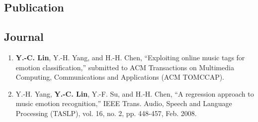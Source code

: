 \documentclass{res}
\begin{document}
\begin{CJK}{UTF8}{bsmi}
\begin{resume}
\section{Publication}
	\vspace{-0.1in}
	\subsection{Journal}
		\begin{enumerate}[1.~]
			\item \textbf{Y.-C. Lin}, Y.-H. Yang, and H.-H. Chen, 
				``Exploiting online music tags for emotion classification,''
				submitted to ACM Transactions on Multimedia Computing, Communications and Applications (ACM TOMCCAP).
			\item Y.-H. Yang, \textbf{Y.-C. Lin}, Y.-F. Su, and H.-H. Chen, 
				``A regression approach to music emotion recognition,'' 
				IEEE Trans. Audio, Speech and Language Processing (TASLP), 
				vol. 16, no. 2, pp. 448-457, Feb. 2008.
		\end{enumerate}	

\end{resume}
\end{CJK}
\end{document}
